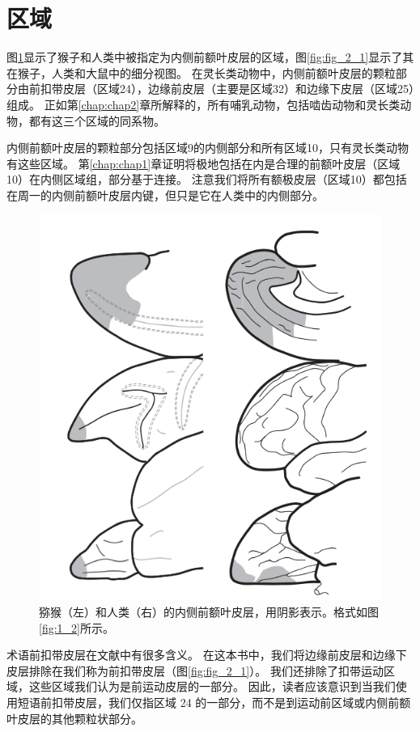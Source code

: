 \section{区域}

图\ref{fig:3_1}显示了猴子和人类中被指定为内侧前额叶皮层的区域，图\ref{fig:fig_2_1}显示了其在猴子，人类和大鼠中的细分视图。
在灵长类动物中，内侧前额叶皮层的颗粒部分由前扣带皮层（区域24），边缘前皮层（主要是区域32）和边缘下皮层（区域25）组成。
正如第\ref{chap:chap2}章所解释的，所有哺乳动物，包括啮齿动物和灵长类动物，都有这三个区域的同系物。\par
内侧前额叶皮层的颗粒部分包括区域9的内侧部分和所有区域10，只有灵长类动物有这些区域。
第\ref{chap:chap1}章证明将极地包括在内是合理的前额叶皮层（区域10）在内侧区域组，部分基于连接。
注意我们将所有额极皮层（区域10）都包括在周一的内侧前额叶皮层内键，但只是它在人类中的内侧部分。


\begin{figure}[!htb]
	\centering
	\includegraphics{image_pfc/Fig_3_1}
	\caption{猕猴（左）和人类（右）的内侧前额叶皮层，用阴影表示。格式如图\ref{fig:1_2}所示。}
	\label{fig:3_1}
\end{figure}


术语前扣带皮层在文献中有很多含义。
在这本书中，我们将边缘前皮层和边缘下皮层排除在我们称为前扣带皮层（图\ref{fig:fig_2_1}）。
我们还排除了扣带运动区域，这些区域我们认为是前运动皮层的一部分。
因此，读者应该意识到当我们使用短语前扣带皮层，我们仅指区域 24 的一部分，而不是到运动前区域或内侧前额叶皮层的其他颗粒状部分。\par


